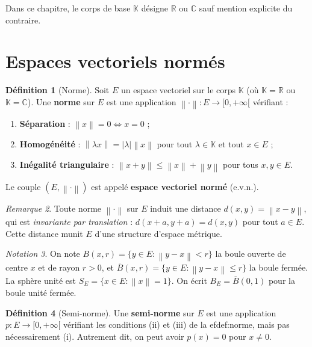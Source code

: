 \documentclass[a4paper,12pt]{book}
\newcommand{\R}{\mathbb{R}}
\newcommand{\C}{\mathbb{C}}
\newcommand{\K}{\mathbb{K}}
\newcommand{\norm}[1]{\left\| #1 \right\|}
\newcommand{\abs}[1]{\left| #1 \right|}
\theoremstyle{definition}
\newtheorem{definition}{Définition}[chapter]
\theoremstyle{plain}
\theoremstyle{remark}
\newtheorem{remarque}[definition]{Remarque}
\newtheorem{notation}[definition]{Notation}
\begin{document}
Dans ce chapitre, le corps de base $\K$ désigne $\R$ ou $\C$ sauf mention explicite du contraire.

\section{Espaces vectoriels normés}

\begin{definition}[Norme]\label{def:norme}
Soit $E$ un espace vectoriel sur le corps $\K$ (où $\K = \R$ ou $\K = \C$). Une \textbf{norme} sur $E$ est une application $\norm{\cdot} : E \to [0, +\infty[$ vérifiant :
\begin{enumerate}[label=(\roman*)]
    \item \textbf{Séparation} : $\norm{x} = 0 \iff x = 0$ ;
    \item \textbf{Homogénéité} : $\norm{\lambda x} = \abs{\lambda} \norm{x}$ pour tout $\lambda \in \K$ et tout $x \in E$ ;
    \item \textbf{Inégalité triangulaire} : $\norm{x + y} \leq \norm{x} + \norm{y}$ pour tous $x, y \in E$.
\end{enumerate}
Le couple $(E, \norm{\cdot})$ est appelé \textbf{espace vectoriel normé} (e.v.n.).
\end{definition}

\begin{remarque}\label{rem:distance-induite}
Toute norme $\norm{\cdot}$ sur $E$ induit une distance $d(x,y) = \norm{x - y}$, qui est \emph{invariante par translation} : $d(x+a, y+a) = d(x,y)$ pour tout $a \in E$. Cette distance munit $E$ d'une structure d'espace métrique.
\end{remarque}

\begin{notation}\label{not:boules}
On note $B(x,r) = \{y \in E : \norm{y - x} < r\}$ la boule ouverte de centre $x$ et de rayon $r > 0$, et $\overline{B}(x,r) = \{y \in E : \norm{y - x} \leq r\}$ la boule fermée. La sphère unité est $S_E = \{x \in E : \norm{x} = 1\}$. On écrit $B_E = \overline{B}(0,1)$ pour la boule unité fermée.
\end{notation}

\begin{definition}[Semi-norme]\label{def:semi-norme}
Une \textbf{semi-norme} sur $E$ est une application $p : E \to [0,+\infty[$ vérifiant les conditions (ii) et (iii) de la 
ef{def:norme}, mais pas nécessairement (i). Autrement dit, on peut avoir $p(x) = 0$ pour $x \neq 0$.
\end{definition}
\end{document}
